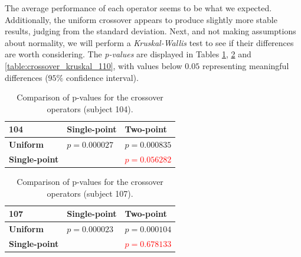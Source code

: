     The average performance of each operator seems to be what we expected. Additionally, the uniform crossover appears to produce slightly more stable results, judging from the standard deviation. Next, and not making assumptions about normality, we will perform a \textit{Kruskal-Wallis} test to see if their differences are worth considering. The \textit{p-values} are displayed in Tables \ref{table:crossover_kruskal_104}, \ref{table:crossover_kruskal_107} and \ref{table:crossover_kruskal_110}, with values below $0.05$ representing meaningful differences ($95\%$ confidence interval).

	\begin{table}[h]

        \centering
        \setlength\arrayrulewidth{0.8pt}

        \begin{tabular}{| >{\centering\arraybackslash}m{0.9in} | >{\centering\arraybackslash}m{0.9in} | >{\centering\arraybackslash}m{0.9in} |}

            \hline
            \rowcolor{RoyalBlue}
            \textbf{104} & \textbf{Single-point} & \textbf{Two-point} \\
            \hline
            \cellcolor{RoyalBlue}\textbf{Uniform} & $p = 0.000027$ & $p = 0.000835$ \\
            \hline
            \cellcolor{RoyalBlue}\textbf{Single-point} & \cellcolor{lightgray} & \textcolor{red}{$p = 0.056282$} \\
            \hline

        \end{tabular}

        \caption{Comparison of p-values for the crossover operators (subject 104).}\label{table:crossover_kruskal_104}

    \end{table}

    \begin{table}[h]

        \centering
        \setlength\arrayrulewidth{0.8pt}

        \begin{tabular}{| >{\centering\arraybackslash}m{0.9in} | >{\centering\arraybackslash}m{0.9in} | >{\centering\arraybackslash}m{0.9in} |}

            \hline
            \rowcolor{RoyalBlue}
            \textbf{107} & \textbf{Single-point} & \textbf{Two-point} \\
            \hline
            \cellcolor{RoyalBlue}\textbf{Uniform} & $p = 0.000023$ & $p = 0.000104$ \\
            \hline
            \cellcolor{RoyalBlue}\textbf{Single-point} & \cellcolor{lightgray} & \textcolor{red}{$p = 0.678133$} \\
            \hline

        \end{tabular}

        \caption{Comparison of p-values for the crossover operators (subject 107).}\label{table:crossover_kruskal_107}

    \end{table}


